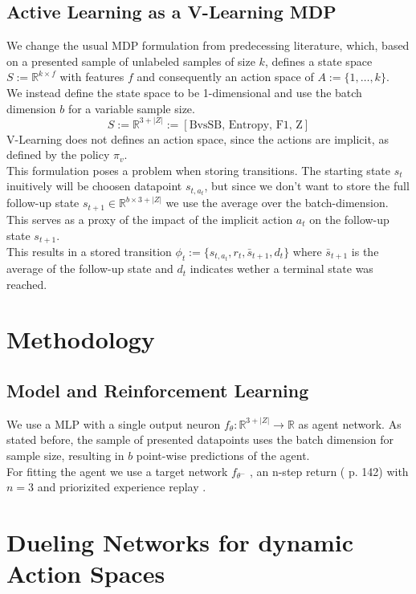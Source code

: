 \documentclass[]{article}
\begin{document}
\subsection{Active Learning as a V-Learning MDP}
We change the usual MDP formulation from predecessing literature, which, based on a presented sample of unlabeled samples of size $k$, defines a state space $S := \mathbb{R}^{k \times f}$ with features $f$ and consequently an action space of $A := \{ 1, \ldots, k \}$. \\ [1mm]
We instead define the state space to be 1-dimensional and use the batch dimension $b$ for a variable sample size.
\begin{equation}
	S := \mathbb{R}^{3+|Z|} := [\text{BvsSB, Entropy, F1, Z}]
\end{equation}
V-Learning does not defines an action space, since the actions are implicit, as defined by the policy $\pi_v$. \\
This formulation poses a problem when storing transitions. The starting state $s_t$ inuitively will be choosen datapoint $s_{t, a_t}$, but since we don't want to store the full follow-up state $s_{t+1} \in \mathbb{R}^{b \times 3+|Z|}$ we use the average over the batch-dimension.
This serves as a proxy of the impact of the implicit action $a_t$ on the follow-up state $s_{t+1}$.\\
This results in a stored transition $\phi_t := \{ s_{t, a_t}, r_t, \bar{s}_{t+1}, d_t \}$ where $\bar{s}_{t+1}$ is the average of the follow-up state and $d_t$ indicates wether a terminal state was reached.

\section{Methodology}
\subsection{Model and Reinforcement Learning}
We use a MLP with a single output neuron $f_\theta : \mathbb{R}^{3+|Z|} \rightarrow \mathbb{R}$ as agent network.
As stated before, the sample of presented datapoints uses the batch dimension for sample size, resulting in $b$ point-wise predictions of the agent. \\
For fitting the agent we use a target network $f_{\theta^-}$ \cite{double_q_learning}, an n-step return (\cite{rl_intro} p. 142) with $n=3$ and priorizited experience replay \cite{prioritized_replay}.


\section{Dueling Networks for dynamic Action Spaces}



 
\end{document}
